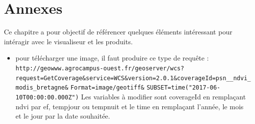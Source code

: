 \documentclass[10pt,a4paper]{article}
\begin{document}
\section{Annexes}

Ce chapitre a pour objectif de référencer quelques éléments intéressant pour intéragir avec le visualiseur et les produits.

\begin{itemize}
\item pour télécharger une image, il faut produire ce type de requête : \newline
\verb!http://geowww.agrocampus-ouest.fr/geoserver/wcs?!\newline\verb!request=GetCoverage&service=WCS&version=2.0.1&!\newline\verb!coverageId=psn__ndvi_modis_bretagne&!
\newline\verb!Format=image/geotiff&!
\newline\verb!SUBSET=time("2017-06-10T00:00:00.000Z")! \smallbreak 
Les variables à modifier sont coverageId en remplaçant ndvi par ef, tempjour ou tempnuit et le time en remplaçant l'année, le mois et le jour par la date souhaitée.
\end{itemize}
\end{document}

